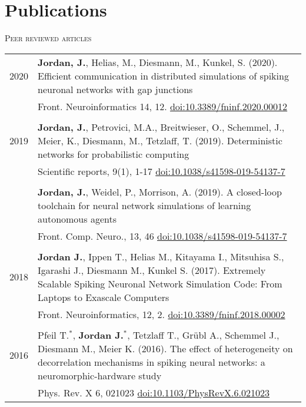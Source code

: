 \section{Publications}
\textsc{Peer reviewed articles}
\begin{longtable}{>{\hfill}p{1.6cm} p{}}
  2020 & \textbf{Jordan, J.}, Helias, M., Diesmann, M., Kunkel, S. (2020). Efficient communication in distributed simulations of spiking neuronal networks with gap junctions \\
       & \footnotesize Front. Neuroinformatics 14, 12. \href{https://doi.org/10.3389/fninf.2020.00012}{doi:10.3389/fninf.2020.00012} \\
  \multicolumn{2}{c}{} \\
  2019 & \textbf{Jordan, J.}, Petrovici, M.A., Breitwieser, O., Schemmel, J., Meier, K., Diesmann, M., Tetzlaff, T. (2019). Deterministic networks for probabilistic computing \\
       & \footnotesize Scientific reports, 9(1), 1-17 \href{https://doi.org/10.1038/s41598-019-54137-7}{doi:10.1038/s41598-019-54137-7} \\
  \multicolumn{2}{c}{} \\
       & \textbf{Jordan, J.}, Weidel, P., Morrison, A. (2019). A closed-loop toolchain for neural network simulations of learning autonomous agents \\
       & \footnotesize Front. Comp. Neuro., 13, 46 \href{https://doi.org/10.3389/fncom.2019.00046}{doi:10.1038/s41598-019-54137-7} \\
  \multicolumn{2}{c}{} \\
  2018 & \textbf{Jordan J.}, Ippen T., Helias M., Kitayama I., Mitsuhisa S., Igarashi J., Diesmann M., Kunkel S. (2017). Extremely Scalable Spiking Neuronal Network Simulation Code: From Laptops to Exascale Computers \\
       & \footnotesize Front. Neuroinformatics, 12, 2. \href{https://doi.org/10.3389/fninf.2018.00002}{doi:10.3389/fninf.2018.00002} \\
  \multicolumn{2}{c}{} \\
  2016 & Pfeil T.$^*$, \textbf{Jordan J.}$^*$, Tetzlaff T., Gr\"ubl A., Schemmel J., Diesmann M., Meier K. (2016). The effect of heterogeneity on decorrelation mechanisms in spiking neural networks: a neuromorphic-hardware study \\
       & \footnotesize Phys. Rev. X 6, 021023 \href{http://dx.doi.org/10.1103/PhysRevX.6.021023}{doi:10.1103/PhysRevX.6.021023} \\
\end{longtable}

